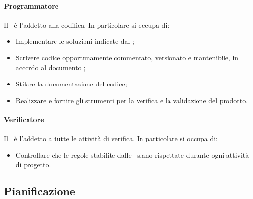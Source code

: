 \documentclass[../NormeDiProgetto.tex]{subfiles}
\begin{document}
				\paragraph{Programmatore\\}
					Il \programmatore\ è l'addetto alla codifica. In particolare si occupa di:
					\begin{itemize}
						\item Implementare le soluzioni indicate dal \progettista;
						\item Scrivere codice opportunamente commentato, versionato e mantenibile, in
						accordo al documento \normediprogetto;
						\item Stilare la documentazione del codice;
						\item Realizzare e fornire gli strumenti per la verifica e la validazione
						del prodotto.
					\end{itemize}
				\paragraph{Verificatore\\}
					Il \verificatore\ è l'addetto a tutte le attività di verifica.
					In particolare si occupa di:
					\begin{itemize}
						\item Controllare che le regole stabilite dalle \normediprogetto\ siano
						rispettate durante ogni attività di progetto.
					\end{itemize}
					
		\subsection{Pianificazione}
				
\end{document}
